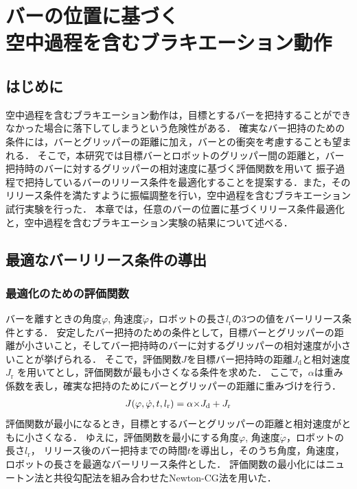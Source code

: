 \chapter[バーの位置に基づく空中過程を含むブラキエーション動作]%
{バーの位置に基づく\\空中過程を含むブラキエーション動作}
      \section{はじめに}
      

      空中過程を含むブラキエーション動作は，目標とするバーを把持することができなかった場合に落下してしまうという危険性がある．
      確実なバー把持のための条件には，バーとグリッパーの距離に加え，バーとの衝突を考慮することも望まれる．
      そこで，本研究では目標バーとロボットのグリッパー間の距離と，バー把持時のバーに対するグリッパーの相対速度に基づく評価関数を用いて
      振子過程で把持しているバーのリリース条件を最適化することを提案する．また，そのリリース条件を満たすように振幅調整を行い，空中過程を含むブラキエーション試行実験を行った．
      本章では，任意のバーの位置に基づくリリース条件最適化と，空中過程を含むブラキエーション実験の結果について述べる．

      \section{最適なバーリリース条件の導出}

      \subsection{最適化のための評価関数}
        
        バーを離すときの角度$\varphi$, 角速度$\dot{\varphi}$，ロボットの長さ$l_{\mathrm{r}}$の3つの値をバーリリース条件とする．
        安定したバー把持のための条件として，目標バーとグリッパーの距離が小さいこと，そしてバー把持時のバーに対するグリッパーの相対速度が小さいことが挙げられる．
        そこで，評価関数$J$を目標バー把持時の距離$J_{\mathrm{d}}$と相対速度$J_{\mathrm{r}}$
        を用いてとし，評価関数が最も小さくなる条件を求めた．
        ここで，$\alpha$は重み係数を表し，確実な把持のためにバーとグリッパーの距離に重みづけを行う．
        \begin{eqnarray}
          \equlabel{J}
          J(\varphi,\dot{\varphi},t,l_{\mathrm{r}})=\alpha{\times}J_{\mathrm{d}}+J_{\mathrm{r}}
        \end{eqnarray}
        評価関数が最小になるとき，目標とするバーとグリッパーの距離と相対速度がともに小さくなる．
        ゆえに，評価関数を最小にする角度$\varphi$, 角速度$\dot{\varphi}$，ロボットの長さ$l_{\mathrm{r}}$，
        リリース後のバー把持までの時間$t$を導出し，そのうち角度，角速度，ロボットの長さを最適なバーリリース条件とした．
        評価関数の最小化にはニュートン法と共役勾配法を組み合わせたNewton-CG法を用いた．

